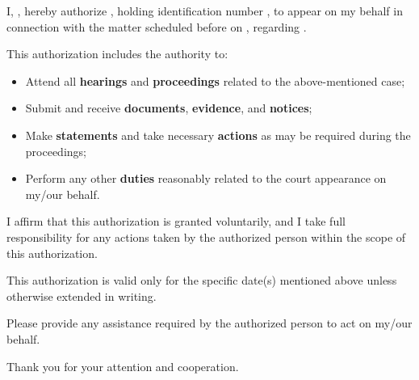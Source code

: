
I, \senderName{}, hereby authorize \authorizedPerson{}, holding identification number \authorizedPersonID{}, to appear on my behalf in connection with the matter scheduled before \courtName{} on \courtDate{}, regarding \courtCase{}.

This authorization includes the authority to:

\begin{itemize}
  \item Attend all \textbf{hearings} and \textbf{proceedings} related to the above-mentioned case;
  \item Submit and receive \textbf{documents}, \textbf{evidence}, and \textbf{notices};
  \item Make \textbf{statements} and take necessary \textbf{actions} as may be required during the proceedings;
  \item Perform any other \textbf{duties} reasonably related to the court appearance on my/our behalf.  
\end{itemize}

I affirm that this authorization is granted voluntarily, and I take full responsibility for any actions taken by the authorized person within the scope of this authorization. 

This authorization is valid only for the specific date(s) mentioned above unless otherwise extended in writing.

Please provide any assistance required by the authorized person to act on my/our behalf.

Thank you for your attention and cooperation.


